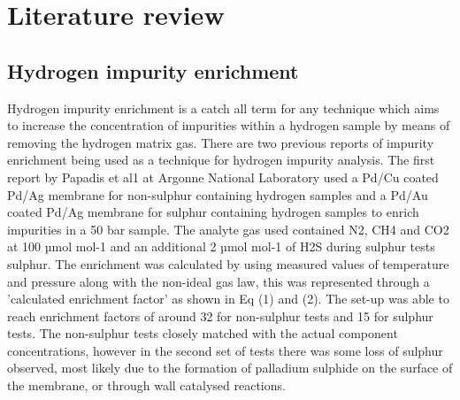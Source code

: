 \chapter{Literature review}

\section{Hydrogen impurity enrichment}
Hydrogen impurity enrichment is a catch all term for any technique which aims to increase the concentration of impurities within a hydrogen sample by means of removing the hydrogen matrix gas. There are two previous reports of impurity enrichment being used as a technique for hydrogen impurity analysis. The first report by Papadis et al1 at Argonne National Laboratory used a Pd/Cu coated Pd/Ag membrane for non-sulphur containing hydrogen samples and a Pd/Au coated Pd/Ag membrane for sulphur containing hydrogen samples to enrich impurities in a 50 bar sample. The analyte gas used contained N2, CH4 and CO2 at 100 µmol mol-1 and an additional 2 µmol mol-1 of H2S during sulphur tests sulphur. The enrichment was calculated by using measured values of temperature and pressure along with the non-ideal gas law, this was represented through a 'calculated enrichment factor' as shown in Eq (1) and (2). The set-up was able to reach enrichment factors of around 32 for non-sulphur tests and 15 for sulphur tests. The non-sulphur tests closely matched with the actual component concentrations, however in the second set of tests there was some loss of sulphur observed, most likely due to the formation of palladium sulphide on the surface of the membrane, or through wall catalysed reactions. 

% 
% 